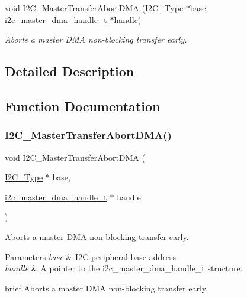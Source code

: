 \begin{DoxyCompactItemize}
void \mbox{\hyperlink{group__i2c__dma__driver_ga209877e924b049c835adc6bfb8690f5a}{I2\+C\+\_\+\+Master\+Transfer\+Abort\+D\+MA}} (\mbox{\hyperlink{struct_i2_c___type}{I2\+C\+\_\+\+Type}} $\ast$base, \mbox{\hyperlink{group__i2c__dma__driver_gab13fb9488effeb728350d3bf8d6c784a}{i2c\+\_\+master\+\_\+dma\+\_\+handle\+\_\+t}} $\ast$handle)
\begin{DoxyCompactList}\small\item\em Aborts a master D\+MA non-\/blocking transfer early. \end{DoxyCompactList}\end{DoxyCompactItemize}


\subsection{Detailed Description}


\subsection{Function Documentation}
\mbox{\label{group__i2c__dma__driver_ga209877e924b049c835adc6bfb8690f5a}} 
\subsubsection{\texorpdfstring{I2C\_MasterTransferAbortDMA()}{I2C\_MasterTransferAbortDMA()}}
{\footnotesize\ttfamily void I2\+C\+\_\+\+Master\+Transfer\+Abort\+D\+MA (\begin{DoxyParamCaption}\item[{\mbox{\hyperlink{struct_i2_c___type}{I2\+C\+\_\+\+Type}} $\ast$}]{base,  }\item[{\mbox{\hyperlink{group__i2c__dma__driver_gab13fb9488effeb728350d3bf8d6c784a}{i2c\+\_\+master\+\_\+dma\+\_\+handle\+\_\+t}} $\ast$}]{handle }\end{DoxyParamCaption})}



Aborts a master D\+MA non-\/blocking transfer early. 


\begin{DoxyParams}{Parameters}
{\em base} & I2C peripheral base address \\
\hline
{\em handle} & A pointer to the i2c\+\_\+master\+\_\+dma\+\_\+handle\+\_\+t structure.\\
\hline
\end{DoxyParams}
brief Aborts a master D\+MA non-\/blocking transfer early.

